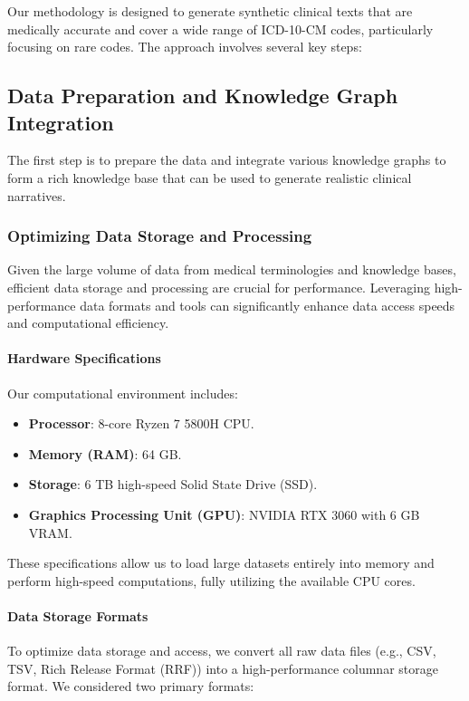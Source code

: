 \documentclass[12pt, a4paper]{article}
\begin{document}
Our methodology is designed to generate synthetic clinical texts that are medically accurate and cover a wide range of ICD-10-CM codes, particularly focusing on rare codes. The approach involves several key steps:

\subsection{Data Preparation and Knowledge Graph Integration}

The first step is to prepare the data and integrate various knowledge graphs to form a rich knowledge base that can be used to generate realistic clinical narratives.

\subsubsection{Optimizing Data Storage and Processing}

Given the large volume of data from medical terminologies and knowledge bases, efficient data storage and processing are crucial for performance. Leveraging high-performance data formats and tools can significantly enhance data access speeds and computational efficiency.

\paragraph{Hardware Specifications}

Our computational environment includes:

\begin{itemize}
    \item \textbf{Processor}: 8-core Ryzen 7 5800H CPU.
    \item \textbf{Memory (RAM)}: 64 GB.
    \item \textbf{Storage}: 6 TB high-speed Solid State Drive (SSD).
    \item \textbf{Graphics Processing Unit (GPU)}: NVIDIA RTX 3060 with 6 GB VRAM.
\end{itemize}

These specifications allow us to load large datasets entirely into memory and perform high-speed computations, fully utilizing the available CPU cores.

\paragraph{Data Storage Formats}

To optimize data storage and access, we convert all raw data files (e.g., CSV, TSV, Rich Release Format (RRF)) into a high-performance columnar storage format. We considered two primary formats:
\end{document}
